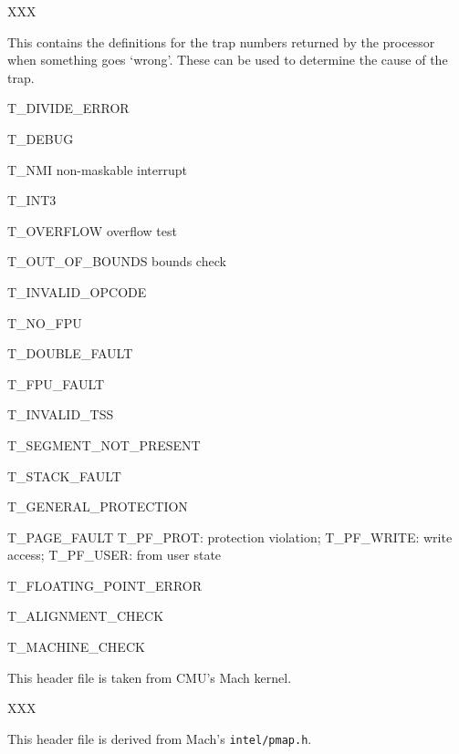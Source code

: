 \label{trap-h}
\begin{apisyn}
\end{apisyn}
\begin{apidesc}
	XXX

	This contains the definitions for the trap numbers returned
	by the processor when something goes `wrong'.
	These can be used to determine the cause of the trap.

	\begin{csymlist}
	\item[T_DIVIDE_ERROR]
	\item[T_DEBUG]
	\item[T_NMI]
		non-maskable interrupt
	\item[T_INT3]
	\item[T_OVERFLOW]
		overflow test
	\item[T_OUT_OF_BOUNDS]
		bounds check
	\item[T_INVALID_OPCODE]
	\item[T_NO_FPU]
	\item[T_DOUBLE_FAULT]
	\item[T_FPU_FAULT]
	\item[T_INVALID_TSS]
	\item[T_SEGMENT_NOT_PRESENT]
	\item[T_STACK_FAULT]
	\item[T_GENERAL_PROTECTION]
	\item[T_PAGE_FAULT]
		T_PF_PROT: protection violation;
		T_PF_WRITE: write access;
		T_PF_USER: from user state
	\item[T_FLOATING_POINT_ERROR]
	\item[T_ALIGNMENT_CHECK]
	\item[T_MACHINE_CHECK]
	\end{csymlist}

	This header file is taken from CMU's Mach kernel.
\end{apidesc}

\begin{apidesc}
	XXX

	This header file is derived from Mach's {\tt intel/pmap.h}.
\end{apidesc}

